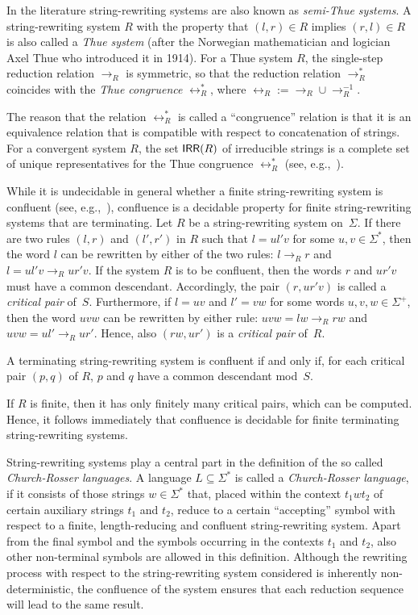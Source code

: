 In the literature string-rewriting systems are also known as \emph{semi-Thue systems}. A string-rewriting system $R$ with the property that $(l, r) \in R$ implies $(r, l) \in R$ is also called a \emph{Thue system} (after the Norwegian mathematician and logician Axel Thue who introduced it in 1914). For a Thue system $R$, the single-step reduction relation $\to_R$ is symmetric, so that the reduction relation $\to^*_R$ coincides with the \emph{Thue congruence} $\leftrightarrow^*_R$, where $\leftrightarrow_R := \rightarrow_R \cup \rightarrow_R^{-1}$.

The reason that the relation $\leftrightarrow^*_R$ is called a ``congruence'' relation is that it is an equivalence relation that is compatible with respect to concatenation of strings. For a convergent system $R$, the set $\IRR(R)$ of irreducible strings is a complete set of unique representatives for the Thue congruence $\leftrightarrow^*_R$ (see, e.g.,~\cite{bookOtto93}).

While it is undecidable in general whether a finite string-rewriting system is confluent (see, e.g.,~\cite{bookOtto93}), confluence is a decidable property for finite string-rewriting systems that are terminating. Let $R$ be a string-rewriting system on~$\Sigma$. If there are two rules $(l, r)$ and $(l', r')$ in $R$ such that $l = ul'v$ for some $u,v\in\Sigma^*$, then the word $l$ can be rewritten by either of the two rules: $l \rightarrow_R r$ and $l =ul'v\rightarrow_R ur'v$. If the system $R$ is to be confluent, then the words $r$ and $ur'v$ must have a common descendant. Accordingly, the pair $(r,ur'v)$ is called a \emph{critical pair} of~$S$. Furthermore, if $l = uv$ and $l'=vw$ for some words $u,v,w\in\Sigma^+$, then the word $uvw$ can be rewritten by either rule: $uvw= l w\rightarrow_R rw$ and $uvw =ul'\rightarrow_R ur'$. Hence, also $(rw,ur')$ is  a \emph{critical pair} of~$R$.

\begin{proposition}\label{PropCon}{\rm \cite{KnBe70}}
A terminating string-rewriting system is confluent if and only if, for each critical pair $(p,q)$ of $R$, $p$ and $q$ have a common descendant mod~$S$. 
\end{proposition}

If $R$ is finite, then it has only finitely many critical pairs, which can be computed. Hence, it follows immediately that confluence is decidable for finite terminating string-rewriting systems.

String-rewriting systems play a central part in the definition of the so called \emph{Church-Rosser languages}. A language $L \subseteq \Sigma^*$ is called a \emph{Church-Rosser language}, if it consists of those strings $w \in \Sigma^*$ that, placed within the context $t_1 w t_2$ of certain auxiliary strings $t_1$ and $t_2$, reduce to a certain ``accepting'' symbol with respect to a finite, length-reducing and confluent string-rewriting system. Apart from the final symbol and the symbols occurring in the contexts $t_1$ and $t_2$, also other non-terminal symbols are allowed in this definition. Although the rewriting process with respect to the string-rewriting system considered is inherently non-deterministic, the confluence of the system ensures that each reduction sequence will lead to the same result.

